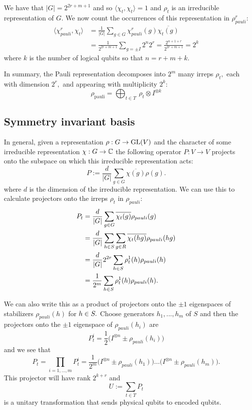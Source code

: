 \documentclass[12pt]{article}
\begin{document}
We have that $|G|=2^{2r+m+1}$ and so
$\langle\chi_{t},\chi_{t}\rangle = 1$ and
$\rho_t$ is an irreducible representation of $G.$
We now count the occurrences of 
this representation in $\rho^r_{pauli}$:
\begin{align*}
\langle\chi^r_{pauli},\chi_{t}\rangle &= \frac{1}{|G|}\sum_{g\in G} \chi^r_{pauli}(g)\overline{\chi_{t}(g)} \\
&= \frac{1}{2^{2r+m+1}} \sum_{g=\pm I} 2^n 2^r = \frac{2^{n+1+r}}{2^{2r+m+1}} = 2^k
\end{align*}
where $k$ is the number of logical qubits so that $n=r+m+k.$

In summary, the Pauli representation decomposes into 
$2^m$ many irreps $\rho_t,$ 
each with dimension $2^r,$ 
and appearing with multiplicity $2^k:$
$$
    \rho_{\mathrm{pauli}} = 
        \bigoplus_{t\in T}\ \rho_t \otimes I^{\otimes k}
$$

\subsection{Symmetry invariant basis}

In general, given a representation $\rho:G\to \mathrm{GL}(V)$
and the character of some irreducible representation $\chi:G\to \mathbb{C}$
the following operator 
$P:V\to V$
projects onto the subspace on which
this irreducible representation acts:
$$
    P := \frac{d}{|G|} \sum_{g\in G} {\overline{\chi(g)}} \rho(g).
$$
where $d$ is the dimension of the irreducible representation.
We can use this to calculate projectors onto the irreps $\rho_t$ in $\rho_{pauli}$:
\begin{align*}
P_t &= \frac{d}{|G|} \sum_{g\in G} \overline{\chi_t(g)} \rho_{pauli}(g) \\
    &= \frac{d}{|G|} \sum_{h\in S}\sum_{g\in R} \overline{\chi_t(hg)} \rho_{pauli}(hg) \\
    &= \frac{d}{|G|} 2^{2r} \sum_{h\in S} {\rho^1_t(h)} \rho_{pauli}(h) \\
    &= \frac{1}{2^m} \sum_{h\in S} {\rho^1_t(h)} \rho_{pauli}(h).
\end{align*}

We can also write this as a product of projectors onto
the $\pm 1$ eigenspaces of stabilizers $\rho_{pauli}(h)$ for $h\in S.$
Choose generators $h_1,...,h_m$ of $S$
and then the projectors onto the $\pm 1$ eigenspace of $\rho_{pauli}(h_i)$ are
$$
P^i_t = \frac{1}{2} \bigl(I^{\otimes n} \pm \rho_{pauli}(h_i) \bigr)
$$
and we see that 
$$
P_t = \prod_{i=1,...,m} P^i_t 
    = \frac{1}{2^m} \bigl(I^{\otimes n} \pm \rho_{pauli}(h_1)\bigr)
    ...\bigl(I^{\otimes n} \pm \rho_{pauli}(h_m)\bigr).
$$
This projector will have rank $2^{k+r}$ and
$$
U := \sum_{t\in T} P_t
$$
is a unitary transformation that sends
physical qubits to encoded qubits.
\end{document}
